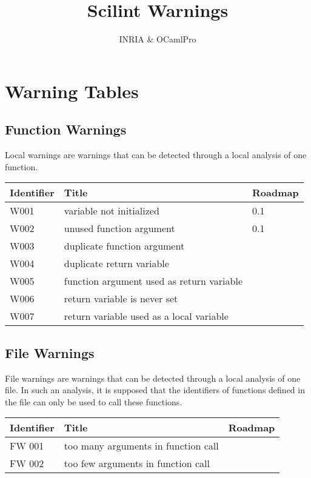 \documentclass{article}
\title{Scilint Warnings}
\author{INRIA \& OCamlPro}
\begin{document}
\maketitle

\section{Warning Tables}


\subsection{Function Warnings}

Local warnings are warnings that can be detected through a local analysis of
one function.

\begin{tabular}{|l|l|l|} \hline
Identifier & Title & Roadmap          \\ \hline
W001 & variable not initialized & 0.1 \\ \hline
W002 & unused function argument & 0.1 \\ \hline
W003 & duplicate function argument &  \\ \hline
W004 & duplicate return variable   &  \\ \hline
W005 & function argument used as return variable   &  \\ \hline
W006 & return variable is never set &  \\ \hline
W007 & return variable used as a local variable &  \\ \hline
\end{tabular}

\subsection{File Warnings}

File warnings are warnings that can be detected through a local
analysis of one file. In such an analysis, it is supposed that the
identifiers of functions defined in the file can only be used to call
these functions.

\begin{tabular}{|l|l|l|} \hline
Identifier & Title & Roadmap          \\ \hline
FW 001 & too many arguments in function call & \\ \hline
FW 002 & too few arguments in function call  & \\ \hline
\end{tabular}
\end{document}
